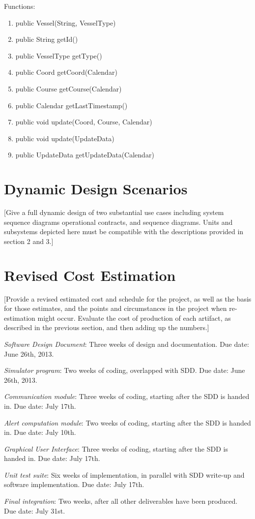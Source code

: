 \documentclass{article}
\begin{document}
\vspace{0.5cm}

Functions:
\begin{enumerate}
	\item public Vessel(String, VesselType)
	\item public String getId()
	\item public VesselType getType()
	\item public Coord getCoord(Calendar)
	\item public Course getCourse(Calendar)
	\item public Calendar getLastTimestamp()
	\item public void update(Coord, Course, Calendar)
	\item public void update(UpdateData)
	\item public UpdateData getUpdateData(Calendar)
\end{enumerate}


\section{Dynamic Design Scenarios} %

[Give a full dynamic design of two substantial use cases including system sequence diagrams operational contracts, and sequence diagrams. Units and subsystems depicted here must be compatible with the descriptions provided in section 2 and 3.]

\section{Revised Cost Estimation} %

[Provide a revised estimated cost and schedule for the project, as well as the basis for those estimates, and the points and circumstances in the project when re-estimation might occur.
Evaluate the cost of production of each artifact, as described in the previous section, and then adding up the numbers.]

\emph{Software Design Document}: Three weeks of design and documentation. Due date: June 26th, 2013.

\emph{Simulator program}: Two weeks of coding, overlapped with SDD. Due date: June 26th, 2013.

\emph{Communication module}: Three weeks of coding, starting after the SDD is handed in. Due date: July 17th.

\emph{Alert computation module}: Two weeks of coding, starting after the SDD is handed in. Due date: July 10th.

\emph{Graphical User Interface}: Three weeks of coding, starting after the SDD is handed in. Due date: July 17th.

\emph{Unit test suite}: Six weeks of implementation, in parallel with SDD write-up and software implementation. Due date: July 17th.

\emph{Final integration}: Two weeks, after all other deliverables have been produced. Due date: July 31st.
\end{document}
